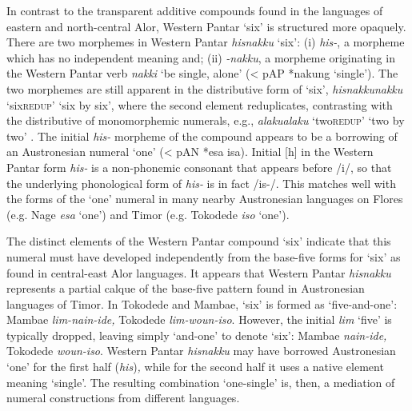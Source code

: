 In contrast to the transparent additive compounds found in the languages of eastern and north-central Alor, Western Pantar `six' is structured more opaquely. There are two morphemes in Western Pantar \textit{hisnakku}\textit{{\ng}} `six': (i) \textit{his-}, a morpheme which has no independent meaning and; (ii) \textit{{}-nakku}\textit{{\ng}}, a morpheme originating in the Western Pantar verb \textit{nakki}\textit{{\ng}} `be single, alone' ({\textless} pAP *nakung `single'). The two morphemes are still apparent in the distributive form of `six', \textit{hisnakku}\textit{{\ng}}\textit{{\Tilde}nakku}\textit{{\ng}} `six{\Tilde}\textsc{redup}' `six by six', where the second element reduplicates, contrasting with the distributive of monomorphemic numerals, e.g., \textit{alaku{\Tilde}alaku} `two{\Tilde}\textsc{redup}' `two by two' \citep{KlamerSchapperTV}. The initial \textit{his-} morpheme of the compound appears to be a borrowing of an Austronesian numeral `one' ({\textless} pAN *esa {\Tilde} isa). Initial [h] in the Western Pantar form \textit{his-} is a non-phonemic consonant that appears before /i/, so that the underlying phonological form of \textit{his-} is in fact /is-/. This matches well with the forms of the `one' numeral in many nearby Austronesian languages on Flores (e.g. Nage \textit{esa} `one') and Timor (e.g. Tokodede \textit{iso} `one'). 

The distinct elements of the Western Pantar compound `six' indicate that this numeral must have developed independently from the base-five forms for `six' as found in central-east Alor languages. It appears that Western Pantar \textit{hisnakku}\textit{{\ng}} represents a partial calque of the base-five pattern found in Austronesian languages of Timor. In Tokodede and Mambae, `six' is formed as `five-and-one': Mambae \textit{lim-nain-ide,} Tokodede \textit{lim-woun-iso}. However, the initial \textit{lim} `five' is typically dropped, leaving simply `and-one' to denote `six': Mambae \textit{nain-ide,} Tokodede \textit{woun-iso}. Western Pantar \textit{hisnakku}\textit{{\ng}} may have borrowed Austronesian `one' for the first half (\textit{his})\textit{,} while for the second half it uses a native element meaning `single'. The resulting combination `one-single' is, then, a mediation of numeral constructions from different languages.

